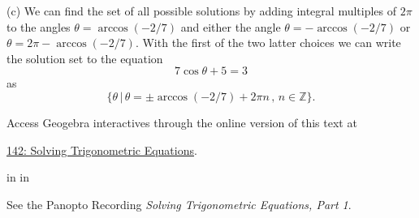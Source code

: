 \documentclass{ximera}
\newcommand{\pskip}{\vskip 0.1 in}
\begin{document}
\begin{example}
\begin{explanation}
(c) We can find the set of all possible solutions by adding integral multiples of $2\pi$ to the angles $\theta  =\arccos(-2/7)$ and either the angle $\theta = -\arccos(-2/7)$ or $\theta = 2\pi - \arccos(-2/7)$. With the first of the two latter choices we can write  the solution set to the equation
\[
     7 \cos\theta +5 =  3 
\]
as
\[
     \{  \theta \, | \, \theta = \pm \arccos(-2/7) + 2\pi n \, , \, n \in \mathbb{Z}    \}.
\]
 


Access Geogebra interactives through the online version of this text at
 
\href{https://www.geogebra.org/classic/qnhtd4h8}{142: Solving Trigonometric Equations}.


\end{explanation}


\pskip \pskip

See the Panopto Recording \emph{Solving Trigonometric Equations, Part 1}.


\end{example}
\end{document}
